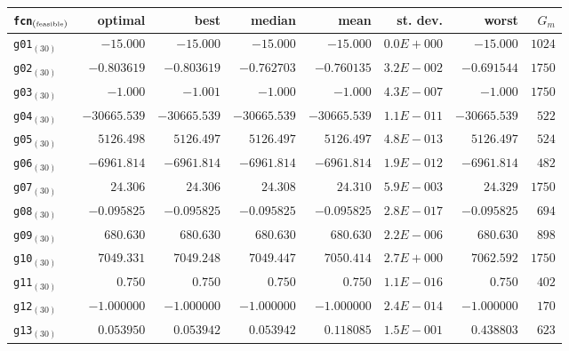 \documentclass[]{article}
\begin{document}
\begin{tabular}{|l|r|rrrrr|r|}
\hline\hline
{\tt fcn}$_{(\mbox{\tiny feasible})}$ & optimal & best & median & mean & st. dev. & worst & $G_m$ \\
\hline
{\tt g01}$_{(30)}$ & $-15.000$ & $-15.000$ & $-15.000$ & $-15.000$ & $0.0E+000$ & $-15.000$ & $1024$ \\
{\tt g02}$_{(30)}$ & $-0.803619$ & $-0.803619$ & $-0.762703$ & $-0.760135$ & $3.2E-002$ & $-0.691544$ & $1750$ \\
{\tt g03}$_{(30)}$ & $-1.000$ & $-1.001$ & $-1.000$ & $-1.000$ & $4.3E-007$ & $-1.000$ & $1750$ \\
{\tt g04}$_{(30)}$ & $-30665.539$ & $-30665.539$ & $-30665.539$ & $-30665.539$ & $1.1E-011$ & $-30665.539$ & $522$ \\
{\tt g05}$_{(30)}$ & $5126.498$ & $5126.497$ & $5126.497$ & $5126.497$ & $4.8E-013$ & $5126.497$ & $524$ \\
{\tt g06}$_{(30)}$ & $-6961.814$ & $-6961.814$ & $-6961.814$ & $-6961.814$ & $1.9E-012$ & $-6961.814$ & $482$ \\
{\tt g07}$_{(30)}$ & $24.306$ & $24.306$ & $24.308$ & $24.310$ & $5.9E-003$ & $24.329$ & $1750$ \\
{\tt g08}$_{(30)}$ & $-0.095825$ & $-0.095825$ & $-0.095825$ & $-0.095825$ & $2.8E-017$ & $-0.095825$ & $694$ \\
{\tt g09}$_{(30)}$ & $680.630$ & $680.630$ & $680.630$ & $680.630$ & $2.2E-006$ & $680.630$ & $898$ \\
{\tt g10}$_{(30)}$ & $7049.331$ & $7049.248$ & $7049.447$ & $7050.414$ & $2.7E+000$ & $7062.592$ & $1750$ \\
{\tt g11}$_{(30)}$ & $0.750$ & $0.750$ & $0.750$ & $0.750$ & $1.1E-016$ & $0.750$ & $402$ \\
{\tt g12}$_{(30)}$ & $-1.000000$ & $-1.000000$ & $-1.000000$ & $-1.000000$ & $2.4E-014$ & $-1.000000$ & $170$ \\
{\tt g13}$_{(30)}$ & $0.053950$ & $0.053942$ & $0.053942$ & $0.118085$ & $1.5E-001$ & $0.438803$ & $623$ \\
\hline\hline
\end{tabular}
\end{document}
